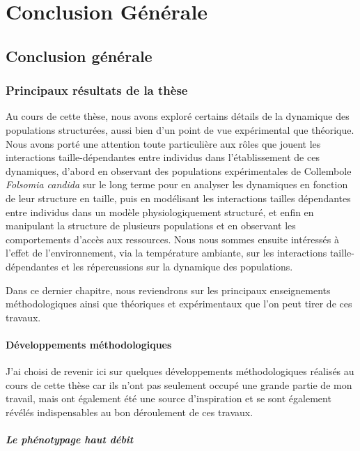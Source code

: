 \part{Conclusion Générale}

\chapter{Conclusion générale}

\section{Principaux résultats de la thèse}

Au cours de cette thèse, nous avons exploré certains détails de la dynamique des
populations structurées, aussi bien d'un point de vue expérimental que
théorique.
Nous avons porté une attention toute particulière aux rôles que jouent les
interactions taille-dépendantes entre individus dans l'établissement de ces
dynamiques, d'abord en observant des populations expérimentales de Collembole
\textit{Folsomia candida} sur le long terme pour en analyser les dynamiques en
fonction de leur structure en taille, puis en modélisant les interactions
tailles dépendantes entre individus dans un modèle physiologiquement structuré,
et enfin en manipulant la structure de plusieurs populations et en observant les
comportements d'accès aux ressources. Nous nous sommes ensuite intéressés à
l'effet de l'environnement, via la température ambiante, sur les interactions
taille-dépendantes et les répercussions sur la dynamique des populations.

Dans ce dernier chapitre, nous reviendrons sur les principaux enseignements
méthodologiques ainsi que théoriques et expérimentaux que l'on peut tirer de ces
travaux.

\subsection{Développements méthodologiques}

J'ai choisi de revenir ici sur quelques développements méthodologiques réalisés
au cours de cette thèse car ils n'ont pas seulement occupé une grande partie de
mon travail, mais ont également été une source d'inspiration et se sont
également révélés indispensables au bon déroulement de ces travaux.

\subsubsection{Le phénotypage haut débit}

